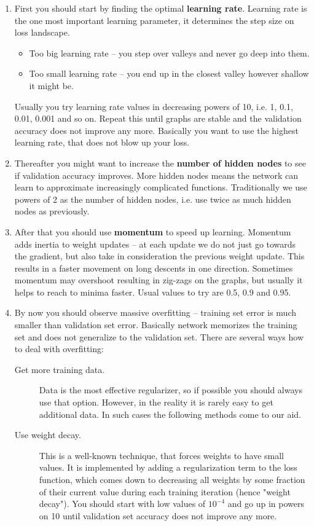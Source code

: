 \documentclass[a4paper,11pt]{article}
\begin{document}
\begin{enumerate}
	\item First you should start by finding the optimal \textbf{learning rate}. Learning rate is the one most important learning parameter, it determines the step size on loss landscape. 
	\begin{itemize}	
		\item Too big learning rate -- you step over valleys and never go deep into them. 
		\item Too small learning rate -- you end up in the closest valley however shallow it might be. 
	\end{itemize}
	Usually you try learning rate values in decreasing powers of 10, i.e. 1, 0.1, 0.01, 0.001 and so on. Repeat this until graphs are stable and the validation accuracy does not improve any more. Basically you want to use the highest learning rate, that does not blow up your loss.
	\item Thereafter you might want to increase the \textbf{number of hidden nodes} to see if validation accuracy improves. More hidden nodes means the network can learn to approximate increasingly complicated functions. Traditionally we use powers of 2 as the number of hidden nodes, i.e. use twice as much hidden nodes as previously.
	\item After that you should use \textbf{momentum} to speed up learning. Momentum adds inertia to weight updates -- at each update we do not just go towards the gradient, but also take in consideration the previous weight update. This results in a faster movement on long descents in one direction. Sometimes momentum may overshoot resulting in zig-zags on the graphs, but usually it helps to reach to minima faster. Usual values to try are 0.5, 0.9 and 0.95.
	\item By now you should observe massive overfitting -- training set error is much smaller than validation set error. Basically network memorizes the training set and does not generalize to the validation set. There are several ways how to deal with overfitting:
	\begin{description}
		\item[Get more training data.] Data is the most effective regularizer, so if possible you should always use that option. However, in the reality it is rarely easy to get additional data. In such cases the following methods come to our aid.
		\item[Use weight decay.] This is a well-known technique, that forces weights to have small values. It is implemented by adding a regularization term to the loss function, which comes down to decreasing all weights by some fraction of their current value during each training iteration (hence "weight decay"). You should start with low values of $10^{-4}$ and go up in powers on 10 until validation set accuracy does not improve any more.

\end{description}
\end{enumerate}
\end{document}
